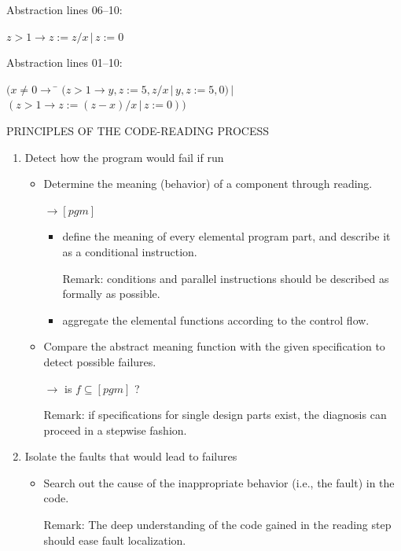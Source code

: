 \bigskip

Abstraction lines 06--10:  

\(z > 1 \rightarrow z := z / x \,|\, z := 0\)

\bigskip

Abstraction lines 01--10:
\begin{tabbing}
$ (x \ne 0 \rightarrow $ \= $( z > 1 \rightarrow y, z := 5, z/x \,|\, y, z := 5,0) \,|\,$ \\
                         \> $( z > 1 \rightarrow z := (z-x) / x \,|\, z := 0))$ \\
\end{tabbing}



\newpage


\centerline{PRINCIPLES OF THE CODE-READING PROCESS}
\bigskip

\begin{enumerate}

\item Detect how the program would fail if run 

\begin{itemize}

\item Determine the meaning (behavior) of a component through
reading. 

$\rightarrow [pgm]$

\begin{itemize}


\item define the meaning of every elemental program part, and describe
it as a conditional instruction.

Remark: conditions and parallel instructions should be described
as formally as possible. 

\item aggregate the elemental functions according to the control flow.

\end{itemize}

\item Compare the abstract meaning function with the given
specification to detect possible failures.

$\rightarrow$ is $ f \subseteq [pgm]$ ?

Remark: if specifications for single design parts exist, 
the diagnosis can proceed in a stepwise fashion.

\end{itemize}

\item Isolate the faults that would lead to failures

\begin{itemize}

\item Search out the cause of the inappropriate behavior (i.e., the fault)
in the code.

Remark: The deep understanding of the code gained in the reading
step should ease fault localization.

\end{itemize}


\end{enumerate}

